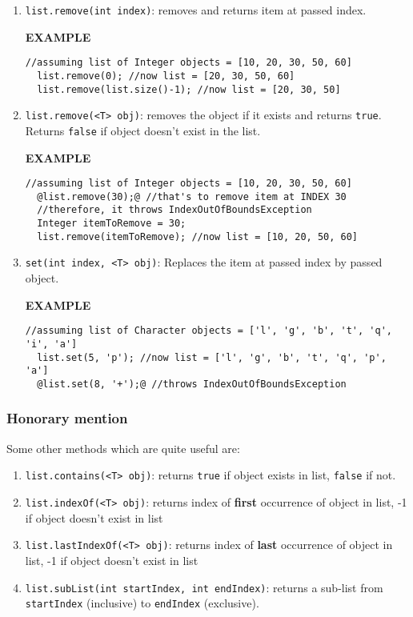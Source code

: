 \begin{enumerate}
  \item \texttt{list.remove(int index)}: removes and returns item at passed index.

    \begin{center} \textbf{EXAMPLE} \end{center}
  \begin{lstlisting}[style=buggy]
  //assuming list of Integer objects = [10, 20, 30, 50, 60]
  list.remove(0); //now list = [20, 30, 50, 60]
  list.remove(list.size()-1); //now list = [20, 30, 50]
  \end{lstlisting}
  
  \item \texttt{list.remove(<T> obj)}: removes the object if it exists and returns \texttt{true}. Returns \texttt{false} if object doesn't exist in the list.

    \begin{center} \textbf{EXAMPLE} \end{center}
  \begin{lstlisting}[style=buggy]
  //assuming list of Integer objects = [10, 20, 30, 50, 60]
  @list.remove(30);@ //that's to remove item at INDEX 30
  //therefore, it throws IndexOutOfBoundsException
  Integer itemToRemove = 30;
  list.remove(itemToRemove); //now list = [10, 20, 50, 60]
  \end{lstlisting}

  \item \texttt{set(int index, <T> obj)}: Replaces the item at passed index by passed object.

    \begin{center} \textbf{EXAMPLE} \end{center}
  \begin{lstlisting}[style=buggy]
  //assuming list of Character objects = ['l', 'g', 'b', 't', 'q', 'i', 'a']
  list.set(5, 'p'); //now list = ['l', 'g', 'b', 't', 'q', 'p', 'a']
  @list.set(8, '+');@ //throws IndexOutOfBoundsException    \end{lstlisting}
\end{enumerate}

\subsubsection{Honorary mention}
Some other methods which are quite useful are:

\begin{enumerate}
\item \texttt{list.contains(<T> obj)}: returns \texttt{true} if object exists in list, \texttt{false} if not.
\item \texttt{list.indexOf(<T> obj)}: returns index of \textbf{first} occurrence of object in list, -1 if object doesn't exist in list	
\item \texttt{list.lastIndexOf(<T> obj)}: returns index of \textbf{last} occurrence of object in list, -1 if object doesn't exist in list
\item \texttt{list.subList(int startIndex, int endIndex)}: returns a sub-list from \texttt{startIndex} (inclusive) to \texttt{endIndex} (exclusive).
\end{enumerate}


